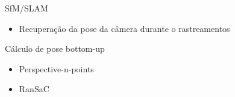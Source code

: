 \documentclass{beamer}
\begin{document}
\begin{frame}
    SfM/SLAM
    \begin{itemize}
        \item Recuperação da pose da câmera durante o rastreamentos
    \end{itemize}
\end{frame}

\begin{frame}
    Cálculo de pose bottom-up
    \begin{itemize}
        \item Perspective-n-points
        \item RanSaC
    \end{itemize}
\end{frame}


% 
% 
% 
\end{document}
